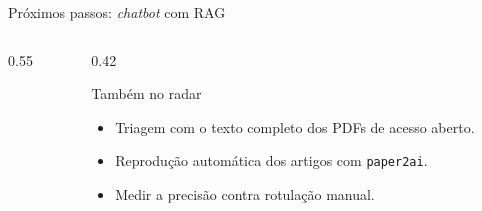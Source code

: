 \documentclass[aspectratio=169, 10pt]{beamer}
\begin{document}
\begin{frame}[t]{Próximos passos: \emph{chatbot} com RAG}
\begin{columns}[T,onlytextwidth]
\begin{column}{0.55\textwidth}
    \end{column}
    \begin{column}{0.42\textwidth}
      \begin{exampleblock}{Também no radar}
        \scriptsize
        \begin{itemize}\setlength{\itemsep}{1pt}
          \item Triagem com o texto completo dos PDFs de acesso aberto.
          \item Reprodução automática dos artigos com \texttt{paper2ai}.
          \item Medir a precisão contra rotulação manual.
        \end{itemize}
      \end{exampleblock}
    \end{column}
  \end{columns}
\end{frame}

\end{document}
